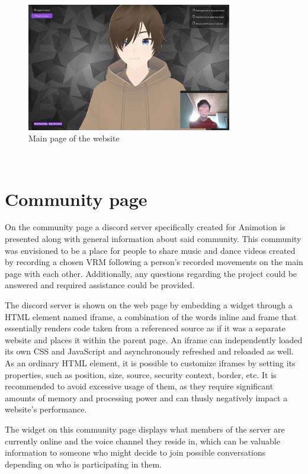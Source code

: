 \\
\begin{figure}[htb]
    \centering
    \includegraphics[width=0.8\textwidth]{pics/Animotion_mainpage.png}
    \caption{Main page of the website}
    \label{fig:mainpage}
\end{figure}
\\

\section{Community page}
On the community page a discord server specifically created for Animotion is presented along with
general information about said community. This community was envisioned to be a place for people
to share music and dance videos created by recording a chosen VRM following a person's recorded
movements on the main page with each other. Additionally, any questions regarding the project could
be answered and required assistance could be provided.

The discord server is shown on the web page by embedding a widget through a HTML element named
iframe, a combination of the words inline and frame that essentially renders code taken from a
referenced source as if it was a separate website and places it within the parent page. An iframe
can independently loaded its own CSS and JavaScript and asynchronously refreshed and reloaded as
well. As an ordinary HTML element, it is possible to customize iframes by setting its properties,
such as position, size, source, security context, border, etc. It is recommended to avoid excessive
usage of them, as they require significant amounts of memory and processing power and can thusly
negatively impact a website's performance. %

The widget on this community page displays what members of the server are currently online and the
voice channel they reside in, which can be valuable information to someone who might decide to join
possible conversations depending on who is participating in them.

